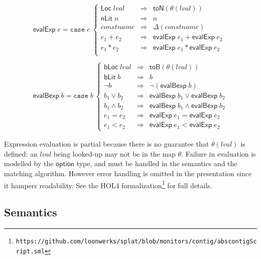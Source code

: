 \documentclass[a4paper,UKenglish,cleveref, autoref, thm-restate]{lipics-v2021}
\newcommand{\konst}[1]{\ensuremath{\mathsf{#1}}}
\newcommand{\lval}{\ensuremath{\mathit{lval}}}
\begin{document}
\[
\begin{array}{l}
\konst{evalExp} \; e =
\mathtt{case}\; e\
 \left\{
 \begin{array}{lcl}
    \konst{Loc}\; \lval & \Rightarrow & \konst{toN}(\theta(\lval)) \\
    \konst{nLit}\; n & \Rightarrow & n  \\
    \mathit{constname} & \Rightarrow & \Delta(\mathit{constname})  \\
    e_1 + e_2 & \Rightarrow & \konst{evalExp}\; e_1 + \konst{evalExp}\; e_2  \\
    e_1 * e_2 & \Rightarrow & \konst{evalExp}\; e_1 * \konst{evalExp}\; e_2  \\
  \end{array}
 \right.
 \\ \\
\konst{evalBexp} \; b =
\mathtt{case}\; b\
 \left\{
 \begin{array}{lcl}
    \konst{bLoc}\; \lval & \Rightarrow & \konst{toB}(\theta(\lval)) \\
    \konst{bLit}\; b & \Rightarrow & b \\
    \neg b & \Rightarrow & \neg(\konst{evalBexp} \; b)  \\
    b_1 \lor b_2 & \Rightarrow & \konst{evalBexp} \;b_1 \lor \konst{evalBexp} \;b_2   \\
    b_1 \land b_2 & \Rightarrow & \konst{evalBexp} \;b_1 \land \konst{evalBexp} \;b_2   \\
    e_1 = e_2 & \Rightarrow & \konst{evalExp} \;e_1 = \konst{evalExp} \;e_2   \\
    e_1 < e_2 & \Rightarrow & \konst{evalExp} \;e_1 < \konst{evalExp} \;e_2
  \end{array}
 \right.

\end{array}
\]

\begin{remark}[Partiality]
Expression evaluation is partial because there is no guarantee that
$\theta(\lval)$ is defined: an \lval{} being looked-up may not be in the
map $\theta$. Failure in evaluation is modelled by the \konst{option}
type, and must be handled in the semantics and the matching
algorithm. However error handling is omitted in the presentation since
it hampers readability. See the HOL4 formalization\footnote{
\texttt{https://github.com/loonwerks/splat/blob/monitors/contig/abscontigScript.sml}}
for full details.
\end{remark}

\subsection{Semantics}
\end{document}
